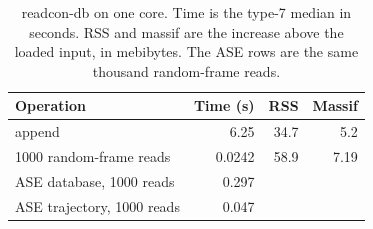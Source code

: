\begin{table}[tbp]
\centering
\footnotesize
\caption{readcon-db on one core.
Time is the type-7 median in seconds.
RSS and massif are the increase above the loaded input, in mebibytes.
The ASE rows are the same thousand random-frame reads.}
\label{tab:rcdb}
\begin{tabular}{@{}lrrr@{}}
\toprule
Operation & Time (s) & RSS & Massif \\
\midrule
append & 6.25 & 34.7 & 5.2 \\
1000 random-frame reads & 0.0242 & 58.9 & 7.19 \\
ASE database, 1000 reads & 0.297 & & \\
ASE trajectory, 1000 reads & 0.047 & & \\
\bottomrule
\end{tabular}
\end{table}
